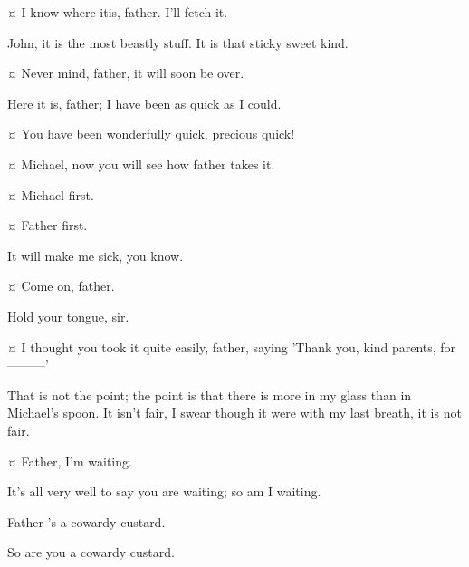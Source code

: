 \begin{drama}
\wendyspeaks {}¤
I know where itis, father.
I'll fetch it.


\mrdarlingspeaks
John, it is the most beastly stuff.
It is that sticky sweet kind.

\johnspeaks {}¤
Never mind, father, it will soon be over.


\wendyspeaks
Here it is, father; I have been as quick as I could.

\mrdarlingspeaks {}¤
You have been wonderfully quick, precious quick!


\wendyspeaks {}¤
Michael, now you will see how father takes it.

\mrdarlingspeaks {}¤
Michael first.

\michaelspeaks {}¤
Father first.

\mrdarlingspeaks
It will make me sick, you know.

\johnspeaks {}¤
Come on, father.

\mrdarlingspeaks
Hold your tongue, sir.

\wendyspeaks {}¤
I thought you took it quite easily, father, saying 'Thank you, kind parents, for———'

\mrdarlingspeaks
That is not the point; the point is that there is more in my glass than in Michael's spoon.
It isn't fair, I swear though it were with my last breath, it is not fair.

\michaelspeaks {}¤
Father, I'm waiting.

\mrdarlingspeaks
It's all very well to say you are waiting; so am I waiting.

\michaelspeaks
Father 's a cowardy custard.

\mrdarlingspeaks
So are you a cowardy custard.



\end{drama}
